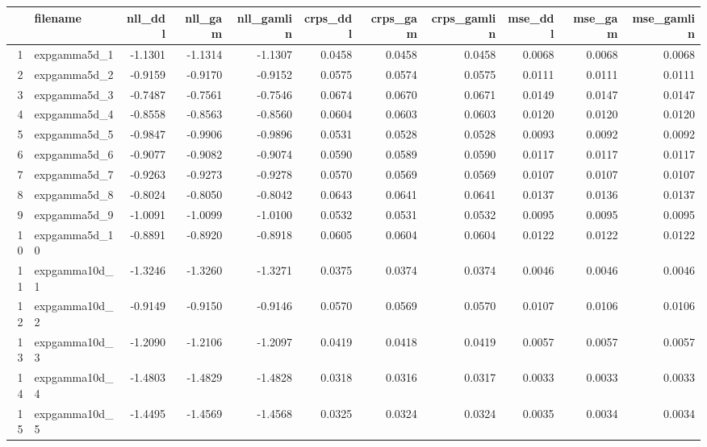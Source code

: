 \begin{table}[ht]
\centering
\begin{tabular}{rlrrrrrrrrr}
  \hline
 & filename & nll\_ddl & nll\_gam & nll\_gamlin & crps\_ddl & crps\_gam & crps\_gamlin & mse\_ddl & mse\_gam & mse\_gamlin \\ 
  \hline
1 & expgamma5d\_1 & -1.1301 & -1.1314 & -1.1307 & 0.0458 & 0.0458 & 0.0458 & 0.0068 & 0.0068 & 0.0068 \\ 
  2 & expgamma5d\_2 & -0.9159 & -0.9170 & -0.9152 & 0.0575 & 0.0574 & 0.0575 & 0.0111 & 0.0111 & 0.0111 \\ 
  3 & expgamma5d\_3 & -0.7487 & -0.7561 & -0.7546 & 0.0674 & 0.0670 & 0.0671 & 0.0149 & 0.0147 & 0.0147 \\ 
  4 & expgamma5d\_4 & -0.8558 & -0.8563 & -0.8560 & 0.0604 & 0.0603 & 0.0603 & 0.0120 & 0.0120 & 0.0120 \\ 
  5 & expgamma5d\_5 & -0.9847 & -0.9906 & -0.9896 & 0.0531 & 0.0528 & 0.0528 & 0.0093 & 0.0092 & 0.0092 \\ 
  6 & expgamma5d\_6 & -0.9077 & -0.9082 & -0.9074 & 0.0590 & 0.0589 & 0.0590 & 0.0117 & 0.0117 & 0.0117 \\ 
  7 & expgamma5d\_7 & -0.9263 & -0.9273 & -0.9278 & 0.0570 & 0.0569 & 0.0569 & 0.0107 & 0.0107 & 0.0107 \\ 
  8 & expgamma5d\_8 & -0.8024 & -0.8050 & -0.8042 & 0.0643 & 0.0641 & 0.0641 & 0.0137 & 0.0136 & 0.0137 \\ 
  9 & expgamma5d\_9 & -1.0091 & -1.0099 & -1.0100 & 0.0532 & 0.0531 & 0.0532 & 0.0095 & 0.0095 & 0.0095 \\ 
  10 & expgamma5d\_10 & -0.8891 & -0.8920 & -0.8918 & 0.0605 & 0.0604 & 0.0604 & 0.0122 & 0.0122 & 0.0122 \\ 
  11 & expgamma10d\_1 & -1.3246 & -1.3260 & -1.3271 & 0.0375 & 0.0374 & 0.0374 & 0.0046 & 0.0046 & 0.0046 \\ 
  12 & expgamma10d\_2 & -0.9149 & -0.9150 & -0.9146 & 0.0570 & 0.0569 & 0.0570 & 0.0107 & 0.0106 & 0.0106 \\ 
  13 & expgamma10d\_3 & -1.2090 & -1.2106 & -1.2097 & 0.0419 & 0.0418 & 0.0419 & 0.0057 & 0.0057 & 0.0057 \\ 
  14 & expgamma10d\_4 & -1.4803 & -1.4829 & -1.4828 & 0.0318 & 0.0316 & 0.0317 & 0.0033 & 0.0033 & 0.0033 \\ 
  15 & expgamma10d\_5 & -1.4495 & -1.4569 & -1.4568 & 0.0325 & 0.0324 & 0.0324 & 0.0035 & 0.0034 & 0.0034 \\ 

\end{tabular}
\end{table}
